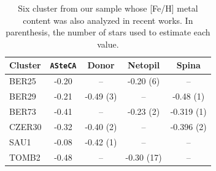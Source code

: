 \documentclass[draft]{aa}
\begin{document}
  \begin{table}
  \caption{Six cluster from our sample whose [Fe/H] metal content was also
  analyzed in recent works. In parenthesis, the number of stars used to estimate
  each value.}
  \label{tab:metal}
  \centering
  \begin{tabular}{lcccc}
  \hline\hline
  Cluster & \texttt{ASteCA} & Donor & Netopil & Spina \\
  \hline %
   BER25  & -0.20  & --         & -0.20 (6)  & -- \\
   BER29  & -0.21  & -0.49 (3)  & --         & -0.48 (1)  \\
   BER73  & -0.41  & --         & -0.23 (2)  & -0.319 (1)  \\
   CZER30 & -0.32  & -0.40 (2)  & --         & -0.396 (2)  \\
   SAU1   & -0.08  & -0.42 (1)  & --         & --  \\
   TOMB2  & -0.48  & --         & -0.30 (17) & -- \\
  \hline
  \end{tabular}
  \end{table}
\end{document}
